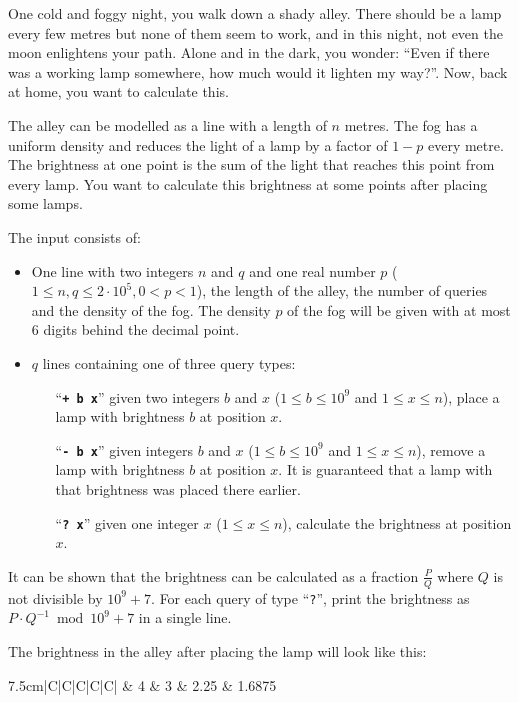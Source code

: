 \problemname{}

%
One cold and foggy night, you walk down a shady alley.
There should be a lamp every few metres but none of them seem to work, and in this night, not even the moon enlightens your path.
Alone and in the dark, you wonder:
``Even if there was a working lamp somewhere, how much would it lighten my way?''.
Now, back at home, you want to calculate this.

The alley can be modelled as a line with a length of $n$ metres.
The fog has a uniform density and reduces the light of a lamp by a factor of $1-p$ every metre.
The brightness at one point is the sum of the light that reaches this point from every lamp.
You want to calculate this brightness at some points after placing some lamps.

\begin{Input}
	The input consists of:
	\begin{itemize}
		\item One line with two integers $n$ and $q$ and one real number $p$  ($1\leq n, q\leq 2\cdot10^5, 0 < p < 1$),
		the length of the alley, the number of queries and the density of the fog.
		The density $p$ of the fog will be given with at most $6$ digits behind the decimal point.
		\item $q$ lines containing one of three query types:
		\begin{enumerate}[leftmargin=4em, topsep=0pt]
			\item[``\textbf{\texttt{+ b x}}''] given two integers $b$ and $x$ ($1\leq b \leq 10^9$ and $1\leq x \leq n$), place a lamp with brightness $b$ at position $x$.
			\item[``\textbf{\texttt{- b x}}''] given integers $b$ and $x$ ($1\leq b \leq 10^9$ and $1\leq x \leq n$), remove a lamp with brightness $b$ at position $x$.
			It is guaranteed that a lamp with that brightness was placed there earlier. 
			\item[``\textbf{\texttt{?~x}}''] given one integer $x$ ($1\leq x \leq n$), calculate the brightness at position $x$.
		\end{enumerate}
	\end{itemize}
\end{Input}
\begin{Output}
	It can be shown that the brightness can be calculated as a fraction $\frac{P}{Q}$ where $Q$ is not divisible by $10^9+7$.
	For each query of type ``\texttt{?}'', print the brightness as $P\cdot Q^{-1} \bmod 10^9+7$ in a single line.
\end{Output}

\nextsample{}
The brightness in the alley after placing the lamp will look like this:

\begin{tabularx}{7.5cm}{|C|C|C|C|C|}
	 & 4 & 3 & 2.25 & 1.6875 \\
	\hline
\end{tabularx}

